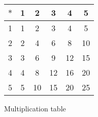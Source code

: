 \documentclass{article}
\begin{document}
  \begin{figure}
    \centering
    \begin{tabular}{c|ccccc}
      $*$ & 1 & 2 & 3 & 4 & 5 \\
      \hline
      1 & 1 & 2 & 3 & 4 & 5 \\
      2 & 2 & 4 & 6 & 8 & 10 \\
      3 & 3 & 6 & 9 & 12 & 15 \\
      4 & 4 & 8 & 12 & 16 & 20 \\
      5 & 5 & 10 & 15 & 20 & 25
    \end{tabular}
    \caption{Multiplication table}
  \end{figure}
\end{document}
